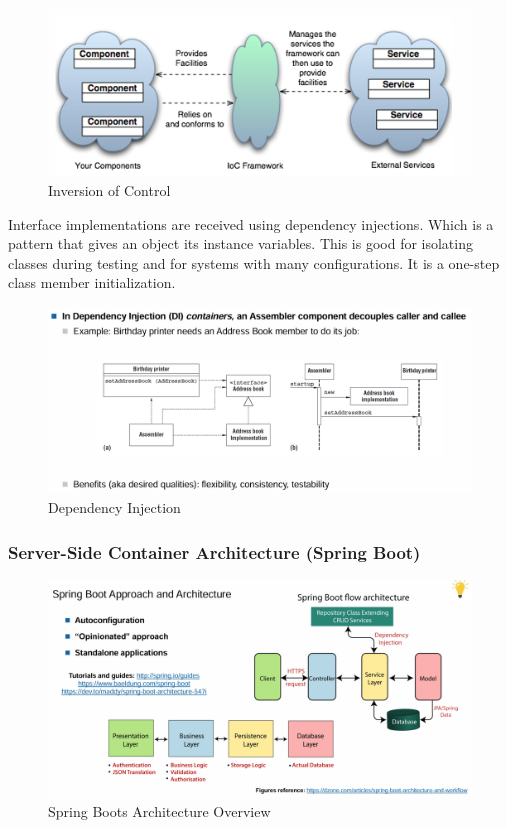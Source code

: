 \documentclass[../Main.tex]{subfiles}
\begin{document}
\begin{figure}[H]
    \centering
    \includegraphics[width=1\linewidth]{Images/ioc.png}
    \caption{Inversion of Control}
\end{figure}

Interface implementations are received using dependency injections.
Which is a pattern that gives an object its instance variables.
This is good for isolating classes during testing and for systems
with many configurations. It is a one-step class member initialization.

\begin{figure}[H]
    \centering
    \includegraphics[width=1\linewidth]{Images/dep-injection.png}
    \caption{Dependency Injection}
\end{figure}

\subsubsection{Server-Side Container Architecture (Spring Boot)}

\begin{figure}[H]
    \centering
    \includegraphics[width=1\linewidth]{Images/spring-boot-arch.png}
    \caption{Spring Boots Architecture Overview}
\end{figure}
\end{document}
